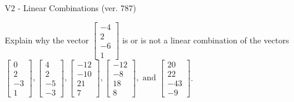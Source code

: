 \begin{exercise}
  \begin{exerciseTitle}V2 - Linear Combinations (ver. 787)\end{exerciseTitle}
  \begin{exerciseStatement}
    Explain why the vector \(\left[\begin{array}{c}
-4 \\
2 \\
-6 \\
1
\end{array}\right]\)  is or is not a linear 
	combination of the vectors \(\left[\begin{array}{c}
0 \\
2 \\
-3 \\
1
\end{array}\right] , \left[\begin{array}{c}
4 \\
2 \\
-5 \\
-3
\end{array}\right] , \left[\begin{array}{c}
-12 \\
-10 \\
21 \\
7
\end{array}\right] , \left[\begin{array}{c}
-12 \\
-8 \\
18 \\
8
\end{array}\right] , \text{ and } \left[\begin{array}{c}
20 \\
22 \\
-43 \\
-9
\end{array}\right]\).
	



\end{exerciseStatement}
\end{exercise}
